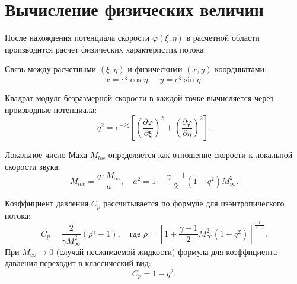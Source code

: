 \section{Вычисление физических величин}
	
	После нахождения потенциала скорости $\varphi(\xi, \eta)$ в расчетной области производится расчет физических характеристик потока.
	
	Связь между расчетными $(\xi, \eta)$ и физическими $(x, y)$ координатами:
	\begin{equation}
		x = e^\xi \cos \eta, \quad y = e^\xi \sin \eta.
	\end{equation}
	
	Квадрат модуля безразмерной скорости в каждой точке вычисляется через производные потенциала:
	\begin{equation}
		q^2 = e^{-2\xi} \left[ \left( \frac{\partial \varphi}{\partial \xi} \right)^2 + \left( \frac{\partial \varphi}{\partial \eta} \right)^2 \right].
	\end{equation}
	
	Локальное число Маха $M_{loc}$ определяется как отношение скорости к локальной скорости звука:
	\begin{equation}
		M_{loc} = \frac{q \cdot M_\infty}{a}, \quad a^2 = 1 + \frac{\gamma-1}{2} (1 - q^2) M_\infty^2.
	\end{equation}
	
	Коэффициент давления $C_p$ рассчитывается по формуле для изэнтропического потока:
	\begin{equation}
		C_p = \frac{2}{\gamma M_\infty^2} \left( \rho^\gamma - 1 \right), \quad \text{где } \rho = \left[ 1 + \frac{\gamma-1}{2} M_\infty^2 (1 - q^2) \right]^{\frac{1}{\gamma-1}}.
	\end{equation}
	При $M_\infty \to 0$ (случай несжимаемой жидкости) формула для коэффициента давления переходит в классический вид:
	\begin{equation}
		C_p = 1 - q^2.
	\end{equation}
